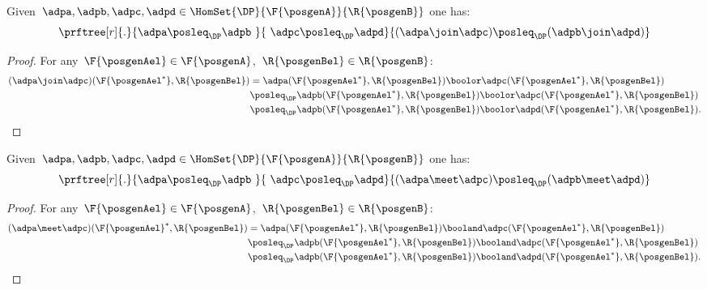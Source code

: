 \begin{lemma}
	\label{lem:coprod_mon}
	Given~$\adpa,\adpb,\adpc,\adpd \in \HomSet{\DP}{\F{\posgenA}}{\R{\posgenB}}$ one has:
	\begin{equation*}
		\prftree[r]{.}{\adpa\posleq_\DP \adpb\ }{\ \adpc\posleq_\DP\adpd}{(\adpa\join\adpc)\posleq_\DP (\adpb\join \adpd)}
	\end{equation*}
\end{lemma}
\begin{proof}
	For any~$\F{\posgenAel}\in \F{\posgenA}$,~$\R{\posgenBel}\in \R{\posgenB}$:
	\begin{equation*}
		\begin{aligned}
			(\adpa \join \adpc)(\F{\posgenAel^*},\R{\posgenBel})
			 & =\adpa(\F{\posgenAel^*},\R{\posgenBel})\boolor \adpc(\F{\posgenAel^*},\R{\posgenBel})             \\
			 & \posleq_\DP \adpb(\F{\posgenAel^*},\R{\posgenBel})\boolor \adpc(\F{\posgenAel^*},\R{\posgenBel})  \\
			 & \posleq_\DP \adpb(\F{\posgenAel^*},\R{\posgenBel})\boolor \adpd(\F{\posgenAel^*},\R{\posgenBel}).
		\end{aligned}
	\end{equation*}
\end{proof}

\begin{lemma}
	\label{lem:intersection_mon}
	Given~$\adpa,\adpb,\adpc,\adpd \in \HomSet{\DP}{\F{\posgenA}}{\R{\posgenB}}$ one has:
	\begin{equation*}
		\prftree[r]{.}{\adpa\posleq_\DP \adpb\ }{\ \adpc\posleq_\DP \adpd}{(\adpa\meet \adpc)\posleq_\DP (\adpb\meet \adpd)}
	\end{equation*}
\end{lemma}
\begin{proof}
	For any~$\F{\posgenAel}\in \F{\posgenA}$,~$\R{\posgenBel}\in \R{\posgenB}$:
	\begin{equation*}
		\begin{aligned}
			(\adpa \meet \adpc)(\F{\posgenAel}^*,\R{\posgenBel})
			 & =\adpa(\F{\posgenAel^*},\R{\posgenBel})\booland \adpc(\F{\posgenAel^*},\R{\posgenBel})             \\
			 & \posleq_\DP \adpb(\F{\posgenAel^*},\R{\posgenBel})\booland \adpc(\F{\posgenAel^*},\R{\posgenBel})  \\
			 & \posleq_\DP \adpb(\F{\posgenAel^*},\R{\posgenBel})\booland \adpd(\F{\posgenAel^*},\R{\posgenBel}).
		\end{aligned}
	\end{equation*}
\end{proof}